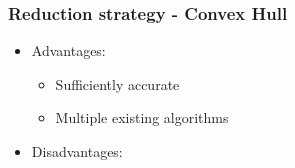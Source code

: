 \begin{frame}
\frametitle{Reduction strategy - Convex Hull}
\begin{multicols}{2}
	\begin{itemize}
		\item Advantages:
		\begin{itemize}
			\item Sufficiently accurate
			\item Multiple existing algorithms
		\end{itemize}
	\end{itemize}
\columnbreak
	\begin{itemize}
		\item Disadvantages:
	\end{itemize}
\end{multicols}

\end{frame}